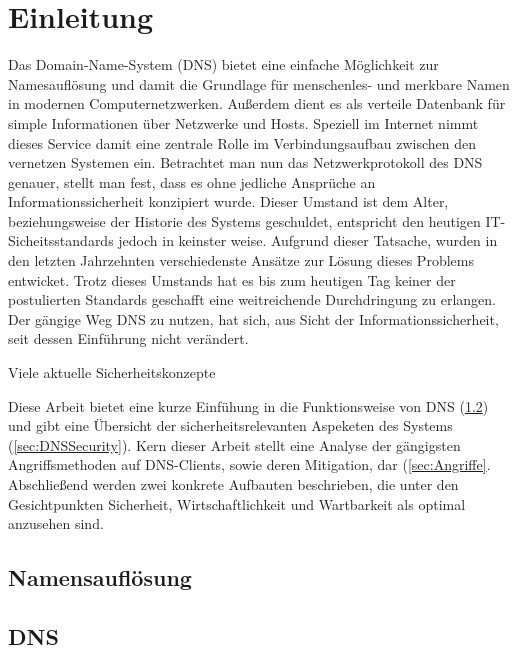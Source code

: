 \chapter{Einleitung}
Das Domain-Name-System (DNS) bietet eine einfache Möglichkeit zur Namesauflösung und damit die Grundlage für menschenles- und merkbare Namen in modernen Computernetzwerken. Außerdem dient es als verteile Datenbank für simple Informationen über Netzwerke und Hosts. Speziell im Internet nimmt dieses Service damit eine zentrale Rolle im Verbindungsaufbau zwischen den vernetzen Systemen ein. Betrachtet man nun das Netzwerkprotokoll des DNS genauer, stellt man fest, dass es ohne jedliche Ansprüche an Informationssicherheit konzipiert wurde. Dieser Umstand ist dem Alter, beziehungsweise der Historie des Systems geschuldet, entspricht den heutigen IT-Sicheitsstandards jedoch in keinster weise. Aufgrund dieser Tatsache, wurden in den letzten Jahrzehnten verschiedenste Ansätze zur Lösung dieses Problems entwicket. Trotz dieses Umstands hat es bis zum heutigen Tag keiner der postulierten Standards geschafft eine weitreichende Durchdringung zu erlangen. Der gängige Weg DNS zu nutzen, hat sich, aus Sicht der Informationssicherheit, seit dessen Einführung nicht verändert.

Viele aktuelle Sicherheitskonzepte 

Diese Arbeit bietet eine kurze Einfühung in die Funktionsweise von DNS (\ref{sec:DNS}) und gibt eine Übersicht der sicherheitsrelevanten Aspeketen des Systems (\ref{sec:DNSSecurity}). Kern dieser Arbeit stellt eine Analyse der gängigsten Angriffsmethoden auf DNS-Clients, sowie deren Mitigation, dar (\ref{sec:Angriffe}. Abschließend werden zwei konkrete Aufbauten beschrieben, die unter den Gesichtpunkten Sicherheit, Wirtschaftlichkeit und Wartbarkeit als optimal anzusehen sind. 

\section{Namensauflösung}

\section{DNS}
\label{sec:DNS}

